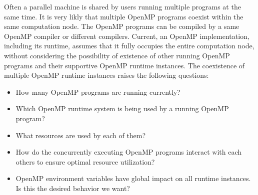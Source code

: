 Often a parallel machine is shared by users running multiple programs at the same time.
It is very likly that multiple OpenMP programs coexist within the same computation node. 
The OpenMP programs can be compiled by a same OpenMP compiler or different compilers. 
Current, an OpenMP implementation, including its runtime, assumes that it fully occupies the entire computation node,
without considering the possibility of existence of other running OpenMP programs and their supportive OpenMP runtime instances. 
The coexistence of multiple OpenMP runtime instances raises the following questions:
\begin{itemize}
\item How many OpenMP programs are running currently?
\item Which OpenMP runtime system is being used by a running OpenMP program?
\item What resources are used by each of them?
\item How do the concurrently executing OpenMP programs interact with each others to ensure optimal resource utilization?
\item OpenMP environment variables have global impact on all runtime instances. Is this the desired behavior we want?
\end{itemize}

